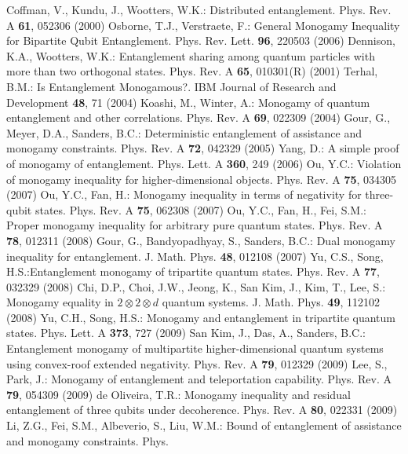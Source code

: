 \documentclass[pra,a4paper,showpacs,superscriptaddress]{revtex4}
\begin{document}
\begin{thebibliography}{50}
 Coffman, V., Kundu, J., Wootters, W.K.: Distributed entanglement. Phys. 
Rev. A {\bf 61}, 052306 (2000)
 Osborne, T.J., Verstraete, F.: General Monogamy 
Inequality for Bipartite Qubit Entanglement. Phys. Rev. 
Lett. {\bf 96}, 220503 (2006)
 Dennison, K.A., Wootters, W.K.: Entanglement sharing 
among quantum particles with more than two orthogonal states. Phys. 
Rev. A {\bf 65}, 010301(R) (2001)
 Terhal, B.M.: Is Entanglement Monogamous?. IBM Journal 
of Research and Development {\bf 48}, 71 (2004)
 Koashi, M., Winter, A.: Monogamy of quantum 
entanglement 
and other correlations. Phys. Rev. A {\bf 69}, 
022309 (2004)
 Gour, G., Meyer, D.A., Sanders, B.C.: Deterministic 
entanglement of assistance and monogamy constraints. Phys. Rev. 
A {\bf 72}, 042329 (2005)
 Yang, D.: A simple proof of monogamy of entanglement. 
Phys. Lett. A {\bf 360}, 249 (2006)
  Ou, Y.C.: Violation of monogamy inequality for 
higher-dimensional objects. Phys. Rev. A {\bf 75}, 034305 (2007)
 Ou, Y.C., Fan, H.: Monogamy inequality in terms of 
negativity for three-qubit states. Phys. Rev. A {\bf 
75}, 062308 (2007) 
 Ou, Y.C., Fan, H., Fei, S.M.: Proper monogamy 
inequality 
for arbitrary pure quantum states. Phys. 
Rev. A {\bf 78}, 012311 (2008)
 Gour, G., Bandyopadhyay, S., Sanders, 
B.C.: Dual monogamy inequality for entanglement. J. Math. Phys. {\bf 
48}, 012108 (2007)
  Yu, C.S., Song, H.S.:Entanglement monogamy of 
tripartite quantum states. Phys. Rev. A
{\bf 77}, 032329 (2008) 
  Chi, D.P., Choi, J.W., Jeong, K., San Kim, J., Kim, 
T., 
Lee, S.: Monogamy equality in $2\otimes 2 \otimes d$ quantum systems. 
J. Math. 
Phys.
{\bf 49}, 112102 (2008)
 Yu, C.H., Song, H.S.: Monogamy and entanglement 
in tripartite quantum states.
Phys. Lett. A {\bf 373}, 727 (2009)
 San Kim, J., Das, A., Sanders, B.C.: Entanglement 
monogamy of multipartite higher-dimensional quantum systems using 
convex-roof
extended negativity. Phys. Rev. A 
{\bf 79}, 012329 (2009)
 Lee, S., Park, J.: Monogamy of entanglement and 
teleportation capability. Phys. Rev. A {\bf 79}, 
054309 (2009)
  de Oliveira, T.R.: Monogamy inequality and residual 
entanglement of three qubits under decoherence. Phys. Rev. A {\bf 80},
022331 (2009)
  Li, Z.G., Fei, S.M., Albeverio, S., Liu, W.M.: 
 Bound of entanglement of assistance and monogamy constraints. Phys. 

\end{thebibliography}
\end{document}
